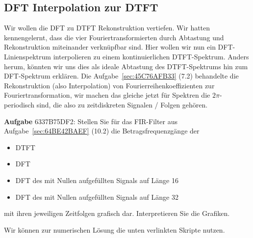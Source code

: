 \subsection{DFT Interpolation zur DTFT}
\label{sec:6337B75DF2}
\begin{Ziel}
Wir wollen die DFT zu DTFT Rekonstruktion vertiefen. Wir hatten kennengelernt,
dass die vier Fouriertransformierten durch Abtastung und Rekonstruktion
miteinander verknüpfbar sind. Hier wollen wir nun ein DFT-Linienspektrum
interpolieren zu einem kontinuierlichen DTFT-Spektrum. Anders herum, könnten
wir uns dies als ideale Abtastung des DTFT-Spektrums hin zum DFT-Spektrum erklären.
Die Aufgabe~\ref{sec:45C76AFB33} (7.2) behandelte die Rekonstruktion (also Interpolation)
von Fourierreihenkoeffizienten zur Fouriertransformation, wir machen das gleiche
jetzt für Spektren die $2\pi$-periodisch sind, die also zu zeitdiskreten Signalen / Folgen
gehören.
\end{Ziel}
\textbf{Aufgabe} {\tiny 6337B75DF2}: Stellen Sie für das FIR-Filter
aus Aufgabe~\ref{sec:64BE42BAEF} (10.2) die Betragsfrequenzgänge der
\begin{itemize}
  \setlength\itemsep{-0.5em}
  \item DTFT
  \item DFT
  \item DFT des mit Nullen aufgefüllten Signals auf Länge 16
  \item DFT des mit Nullen aufgefüllten Signals auf Länge 32
\end{itemize}
mit ihren jeweiligen Zeitfolgen grafisch dar.
Interpretieren Sie die Grafiken.

Wir können zur numerischen Lösung die unten verlinkten Skripte nutzen.

